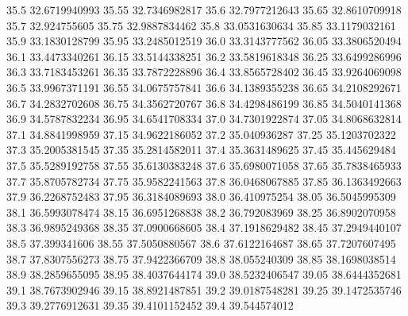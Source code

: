            35.5    32.6719940993
          35.55    32.7346982817
           35.6    32.7977212643
          35.65    32.8610709918
           35.7     32.924755605
          35.75    32.9887834462
           35.8    33.0531630634
          35.85    33.1179032161
           35.9    33.1830128799
          35.95    33.2485012519
           36.0    33.3143777562
          36.05    33.3806520494
           36.1    33.4473340261
          36.15    33.5144338251
           36.2    33.5819618348
          36.25    33.6499286996
           36.3    33.7183453261
          36.35    33.7872228896
           36.4    33.8565728402
          36.45    33.9264069098
           36.5    33.9967371191
          36.55    34.0675757841
           36.6    34.1389355238
          36.65    34.2108292671
           36.7    34.2832702608
          36.75    34.3562720767
           36.8    34.4298486199
          36.85    34.5040141368
           36.9    34.5787832234
          36.95    34.6541708334
           37.0    34.7301922874
          37.05    34.8068632814
           37.1    34.8841998959
          37.15    34.9622186052
           37.2     35.040936287
          37.25    35.1203702322
           37.3    35.2005381545
          37.35    35.2814582011
           37.4    35.3631489625
          37.45     35.445629484
           37.5    35.5289192758
          37.55    35.6130383248
           37.6    35.6980071058
          37.65    35.7838465933
           37.7    35.8705782734
          37.75    35.9582241563
           37.8    36.0468067885
          37.85    36.1363492663
           37.9    36.2268752483
          37.95    36.3184089693
           38.0     36.410975254
          38.05    36.5045995309
           38.1    36.5993078474
          38.15    36.6951268838
           38.2     36.792083969
          38.25    36.8902070958
           38.3    36.9895249368
          38.35    37.0900668605
           38.4    37.1918629482
          38.45    37.2949440107
           38.5     37.399341606
          38.55    37.5050880567
           38.6    37.6122164687
          38.65    37.7207607495
           38.7    37.8307556273
          38.75    37.9422366709
           38.8     38.055240309
          38.85    38.1698038514
           38.9    38.2859655095
          38.95    38.4037644174
           39.0    38.5232406547
          39.05    38.6444352681
           39.1    38.7673902946
          39.15    38.8921487851
           39.2    39.0187548281
          39.25    39.1472535746
           39.3    39.2776912631
          39.35    39.4101152452
           39.4     39.544574012
